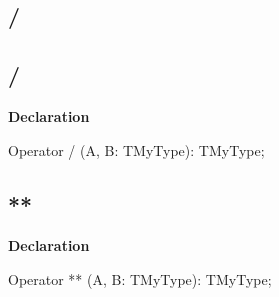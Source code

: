 \documentclass{report}
\newif\ifpdf
\begin{document}
\subsection*{\large{\textbf{/}}\normalsize\hspace{1ex}\hrulefill}
\else
\subsection*{/}
\fi
\label{ok_operator_test-/}
\index{/}
\begin{list}{}{
\setlength{\itemindent}{0cm}
\setlength{\listparindent}{0cm}
\setlength{\leftmargin}{\evensidemargin}
\addtolength{\leftmargin}{\tmplength}
\settowidth{\labelsep}{X}
\addtolength{\leftmargin}{\labelsep}
\setlength{\labelwidth}{\tmplength}
}
\item[\textbf{Declaration}\hfill]
\ifpdf
\begin{flushleft}
\fi
\begin{ttfamily}
Operator / (A, B: TMyType): TMyType;\end{ttfamily}

\ifpdf
\end{flushleft}
\fi

\end{list}
\ifpdf
\subsection*{\large{\textbf{**}}\normalsize\hspace{1ex}\hrulefill}
\else
\subsection*{**}
\fi
\label{ok_operator_test-**}
\index{**}
\begin{list}{}{
\setlength{\itemindent}{0cm}
\setlength{\listparindent}{0cm}
\setlength{\leftmargin}{\evensidemargin}
\addtolength{\leftmargin}{\tmplength}
\settowidth{\labelsep}{X}
\addtolength{\leftmargin}{\labelsep}
\setlength{\labelwidth}{\tmplength}
}
\item[\textbf{Declaration}\hfill]
\ifpdf
\begin{flushleft}
\fi
\begin{ttfamily}
Operator ** (A, B: TMyType): TMyType;\end{ttfamily}

\ifpdf
\end{flushleft}
\fi

\end{list}
\ifpdf
\end{document}
